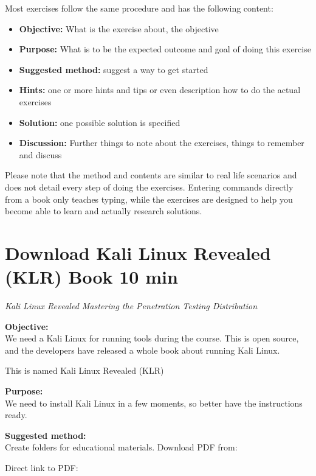 \documentclass[a4paper,11pt,notitlepage]{report}
\begin{document}
Most exercises follow the same procedure and has the following content:
\begin{itemize}
\item {\bf Objective:} What is the exercise about, the objective
\item {\bf Purpose:} What is to be the expected outcome and goal of doing this exercise
\item {\bf Suggested method:} suggest a way to get started
\item {\bf Hints:} one or more hints and tips or even description how to
do the actual exercises
\item {\bf Solution:} one possible solution is specified
\item {\bf Discussion:} Further things to note about the exercises, things to remember and discuss
\end{itemize}

Please note that the method and contents are similar to real life scenarios and does not detail every step of doing the exercises. Entering commands directly from a book only teaches typing, while the exercises are designed to help you become able to learn and actually research solutions.


\chapter{Download Kali Linux Revealed (KLR) Book 10 min}
\label{ex:downloadKLR}



\emph{Kali Linux Revealed  Mastering the Penetration Testing Distribution}


{\bf Objective:}\\
We need a Kali Linux for running tools during the course. This is open source, and the developers have released a whole book about running Kali Linux.

This is named Kali Linux Revealed (KLR)

{\bf Purpose:}\\
We need to install Kali Linux in a few moments, so better have the instructions ready.

{\bf Suggested method:}\\
Create folders for educational materials. Download PDF from:

Direct link to PDF:
\\
\end{document}
